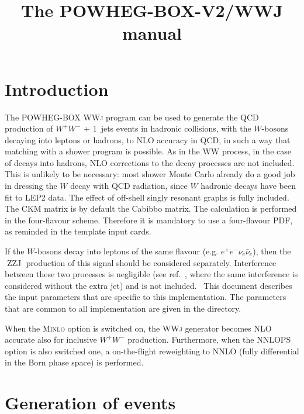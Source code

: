 \documentclass{paper}
\newcommand{\tmop}[1]{\ensuremath{\operatorname{#1}}}
\newcommand{\tmtexttt}[1]{{\ttfamily{#1}}}
\newcommand{\noun}[1]{\textsc{#1}}
\newcommand{\WW}{\noun{WW}}
\newcommand{\WWJ}{\noun{WWj}}
\newcommand{\MINLO}{\noun{Minlo}}
\newcommand{\NNLOPS}{\noun{NNLOPS}}
\begin{document}
\title{The POWHEG-BOX-V2/WWJ manual}

\maketitle

\section{Introduction}

The POWHEG-BOX \WWJ{} program {\cite{Hamilton:2016bfu}} can be used to
generate the QCD production of $W^+ W^-$ + 1~jets events in hadronic
collisions, with the $W$-bosons decaying into leptons or hadrons, to
NLO accuracy in QCD, in such a way that matching with a shower program
is possible. As in the \WW{} process, in the case of decays into
hadrons, NLO corrections to the decay processes are not included. This
is unlikely to be necessary: most shower Monte Carlo already do a good
job in dressing the $W$ decay with QCD radiation, since $W$ hadronic
decays have been fit to LEP2 data. The effect of off-shell singly
resonant graphs is fully included. The CKM matrix is by default the
Cabibbo matrix. The calculation is performed in the four-flavour
scheme. Therefore it is mandatory to use a four-flavour PDF, as
reminded in the template input cards.

If the $W$-bosons decay into leptons of the same flavour (e.g. $e^+
e^- \nu_e \bar{\nu}_e$), then the $\tmop{ZZJ}$ production of this
signal should be considered separately. Interference between these two
processes is negligible (see ref.~\cite{Melia:2011tj}, where the same
interference is considered without the extra jet) and is not
included. \ This document describes the input parameters that are
specific to this implementation. The parameters that are common to all
\tmtexttt{POWHEG BOX} implementation are given in the
\tmtexttt{POWHEG-BOX-V2/Docs} directory.

When the \MINLO{} option is switched on, the \WWJ{} generator becomes
NLO accurate also for inclusive $W^+ W^-$ production. Furthermore,
when the \NNLOPS{} option is also switched one, a on-the-flight
reweighting to NNLO (fully differential in the Born phase space) is
performed.


\section{Generation of events}
\end{document}

